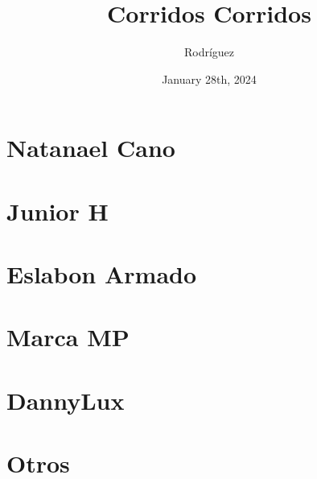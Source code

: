 \documentclass{article}
\title{Corridos Corridos}
\date{January 28th, 2024}
\author{Rodr\'iguez}
\begin{document}
\maketitle{}
\tableofcontents

\renewcommand\guitarPreAccord{\color{amaranth}\footnotesize\strut\bfseries}

%
\section{Natanael Cano}












\section{Junior H}






\section{Eslabon Armado}


\section{Marca MP}


\section{DannyLux}


\section{Otros}




\end{document}
